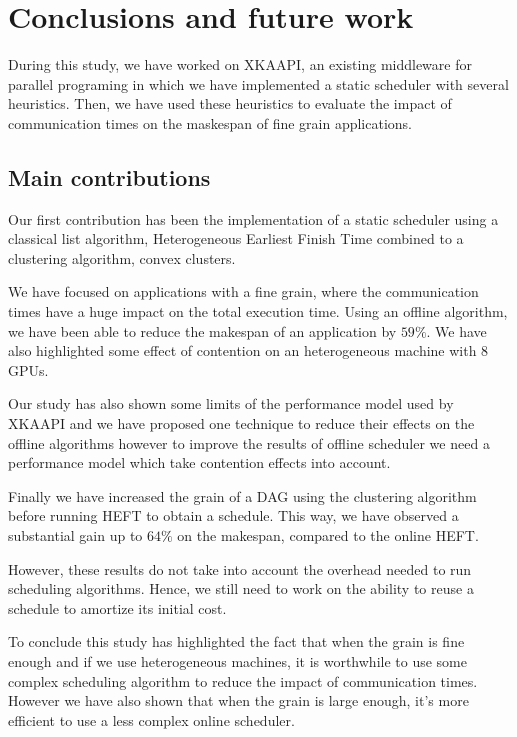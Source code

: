 \documentclass[10pt, conference, compsocconf,pdftex,dvipsnames]{IEEEtran}
\begin{document}
\section{Conclusions and future work}
\label{sec:cncl}
During this study, we have worked on
XKAAPI\cite{gautier2007kaapi,gautierxkaapi}, an existing middleware for parallel
programing in which we have implemented a static scheduler with several
heuristics. Then, we have used these heuristics to evaluate the impact of
communication times on the maskespan of fine grain applications.

\subsection{Main contributions}
\label{chap:cncl-contrib}

Our first contribution has been the implementation of a static scheduler using
a classical list algorithm, Heterogeneous Earliest Finish Time combined to a
clustering algorithm, convex clusters.

We have focused on applications with a fine grain, where the communication
times have a huge impact on the total execution time. Using an offline
algorithm, we have been able to reduce the makespan of an application by
$59\%$. We have also highlighted some effect of contention on an heterogeneous
machine with 8 GPUs. 

Our study has also shown some limits of the performance model used by XKAAPI
and we have proposed one technique to reduce their effects on the offline
algorithms however to improve the results of offline scheduler we need a
performance model which take contention effects into account.

Finally we have increased the grain of a DAG using the clustering algorithm
before running HEFT to obtain a schedule. This way, we have observed a
substantial gain up to $64\%$ on the makespan, compared to the online HEFT.

However, these results do not take into account the overhead needed to run
scheduling algorithms. Hence, we still need to work on the ability to reuse a
schedule to amortize its initial cost. 

To conclude this study has highlighted the fact that when the grain is fine
enough and if we use heterogeneous machines, it is worthwhile to use some 
complex scheduling algorithm to reduce the impact of communication times.
However we have also shown that when the grain is large enough, it's more
efficient to use a less complex online scheduler.
\end{document}
